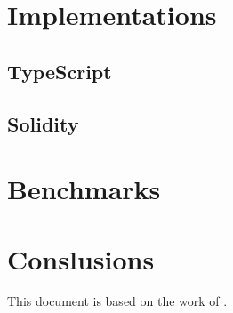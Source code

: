 \documentclass{article}
\begin{document}
\bigbreak

\section{Implementations}

\bigbreak

\subsection{TypeScript}

\bigbreak

\subsection{Solidity}

\bigbreak

\section{Benchmarks}

\section{Conslusions}

This document is based on the work of \cite{semaphorev1whitepaper}.

\sloppy

\printbibliography

\end{document}
